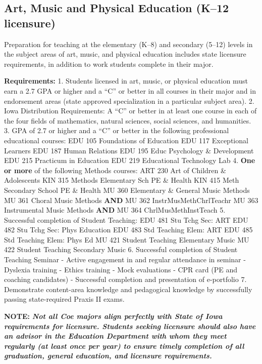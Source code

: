 \documentclass[
  letterpaper,
]{scrbook}
\begin{document}
\subsection{Art, Music and Physical Education (K--12
licensure)}\label{art-music-and-physical-education-k12-licensure}

Preparation for teaching at the elementary (K--8) and secondary (5--12)
levels in the subject areas of art, music, and physical education
includes state licensure requirements, in addition to work students
complete in their major.

\textbf{Requirements:} 1. Students licensed in art, music, or physical
education must earn a 2.7 GPA or higher and a ``C'' or better in all
courses in their major and in endorsement areas (state approved
specialization in a particular subject area). 2. Iowa Distribution
Requirements: A ``C'' or better in at least one course in each of the
four fields of mathematics, natural sciences, social sciences, and
humanities. 3. GPA of 2.7 or higher and a ``C'' or better in the
following professional educational courses: EDU 105 Foundations of
Education EDU 117 Exceptional Learners EDU 187 Human Relations EDU 195
Educ Psychology \& Development EDU 215 Practicum in Education EDU 219
Educational Technology Lab 4. \textbf{One or more} of the following
Methods courses: ART 230 Art of Children \& Adolescents KIN 315 Methods
Elementary Sch PE \& Health KIN 415 Meth Secondary School PE \& Health
MU 360 Elementary \& General Music Methods MU 361 Choral Music Methods
\textbf{AND} MU 362 InstrMusMethChrlTeachr MU 363 Instrumental Music
Methods \textbf{AND} MU 364 ChrlMusMethInstTeach 5. Successful
completion of Student Teaching: EDU 481 Stu Tchg Sec: ART EDU 482 Stu
Tchg Sec: Phys Education EDU 483 Std Teaching Elem: ART EDU 485 Std
Teaching Elem: Phys Ed MU 421 Student Teaching Elementary Music MU 422
Student Teaching Secondary Music 6. Successful completion of Student
Teaching Seminar - Active engagement in and regular attendance in
seminar - Dyslexia training - Ethics training - Mock evaluations - CPR
card (PE and coaching candidates) - Successful completion and
presentation of e-portfolio 7. Demonstrate content-area knowledge and
pedagogical knowledge by successfully passing state-required Praxis II
exams.

\textbf{NOTE:} \textbf{\emph{Not all Coe majors align perfectly with
State of Iowa requirements for licensure. Students seeking licensure
should also have an advisor in the Education Department with whom they
meet regularly (at least once per year) to ensure timely completion of
all graduation, general education, and licensure requirements.}}
\end{document}
